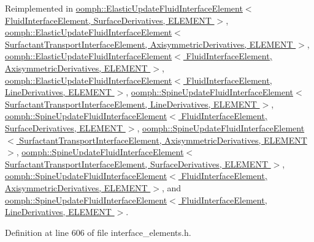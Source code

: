 Reimplemented in \hyperlink{classoomph_1_1ElasticUpdateFluidInterfaceElement_a91c59905720a4417447fcce09032ce7f}{oomph\+::\+Elastic\+Update\+Fluid\+Interface\+Element$<$ Fluid\+Interface\+Element, Surface\+Derivatives, E\+L\+E\+M\+E\+N\+T $>$}, \hyperlink{classoomph_1_1ElasticUpdateFluidInterfaceElement_a91c59905720a4417447fcce09032ce7f}{oomph\+::\+Elastic\+Update\+Fluid\+Interface\+Element$<$ Surfactant\+Transport\+Interface\+Element, Axisymmetric\+Derivatives, E\+L\+E\+M\+E\+N\+T $>$}, \hyperlink{classoomph_1_1ElasticUpdateFluidInterfaceElement_a91c59905720a4417447fcce09032ce7f}{oomph\+::\+Elastic\+Update\+Fluid\+Interface\+Element$<$ Fluid\+Interface\+Element, Axisymmetric\+Derivatives, E\+L\+E\+M\+E\+N\+T $>$}, \hyperlink{classoomph_1_1ElasticUpdateFluidInterfaceElement_a91c59905720a4417447fcce09032ce7f}{oomph\+::\+Elastic\+Update\+Fluid\+Interface\+Element$<$ Fluid\+Interface\+Element, Line\+Derivatives, E\+L\+E\+M\+E\+N\+T $>$}, \hyperlink{classoomph_1_1SpineUpdateFluidInterfaceElement_a8e464c689a19ce2d6fbff2c167dcc41a}{oomph\+::\+Spine\+Update\+Fluid\+Interface\+Element$<$ Surfactant\+Transport\+Interface\+Element, Line\+Derivatives, E\+L\+E\+M\+E\+N\+T $>$}, \hyperlink{classoomph_1_1SpineUpdateFluidInterfaceElement_a8e464c689a19ce2d6fbff2c167dcc41a}{oomph\+::\+Spine\+Update\+Fluid\+Interface\+Element$<$ Fluid\+Interface\+Element, Surface\+Derivatives, E\+L\+E\+M\+E\+N\+T $>$}, \hyperlink{classoomph_1_1SpineUpdateFluidInterfaceElement_a8e464c689a19ce2d6fbff2c167dcc41a}{oomph\+::\+Spine\+Update\+Fluid\+Interface\+Element$<$ Surfactant\+Transport\+Interface\+Element, Axisymmetric\+Derivatives, E\+L\+E\+M\+E\+N\+T $>$}, \hyperlink{classoomph_1_1SpineUpdateFluidInterfaceElement_a8e464c689a19ce2d6fbff2c167dcc41a}{oomph\+::\+Spine\+Update\+Fluid\+Interface\+Element$<$ Surfactant\+Transport\+Interface\+Element, Surface\+Derivatives, E\+L\+E\+M\+E\+N\+T $>$}, \hyperlink{classoomph_1_1SpineUpdateFluidInterfaceElement_a8e464c689a19ce2d6fbff2c167dcc41a}{oomph\+::\+Spine\+Update\+Fluid\+Interface\+Element$<$ Fluid\+Interface\+Element, Axisymmetric\+Derivatives, E\+L\+E\+M\+E\+N\+T $>$}, and \hyperlink{classoomph_1_1SpineUpdateFluidInterfaceElement_a8e464c689a19ce2d6fbff2c167dcc41a}{oomph\+::\+Spine\+Update\+Fluid\+Interface\+Element$<$ Fluid\+Interface\+Element, Line\+Derivatives, E\+L\+E\+M\+E\+N\+T $>$}.



Definition at line 606 of file interface\+\_\+elements.\+h.

\mbox{\label{classoomph_1_1FluidInterfaceElement_aba83fbd0679ffca4ef6aa32f7aa5d179}} 
